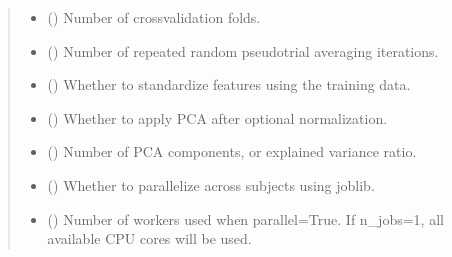 \documentclass[letterpaper,10pt,english]{sphinxhowto}
\begin{document}
\begin{fulllineitems}
\begin{quote}
\begin{description}
\begin{itemize}
\item {} 
\sphinxAtStartPar
{} (\sphinxstyleliteralemphasis{\sphinxupquote{, }}) \textendash{} Number of cross\sphinxhyphen{}validation folds.

\item {} 
\sphinxAtStartPar
{} (\sphinxstyleliteralemphasis{\sphinxupquote{, }}) \textendash{} Number of repeated random pseudo\sphinxhyphen{}trial averaging iterations.

\item {} 
\sphinxAtStartPar
{} (\sphinxstyleliteralemphasis{\sphinxupquote{, }}) \textendash{} Whether to standardize features using the training data.

\item {} 
\sphinxAtStartPar
{} (\sphinxstyleliteralemphasis{\sphinxupquote{, }}) \textendash{} Whether to apply PCA after optional normalization.

\item {} 
\sphinxAtStartPar
{} (\sphinxstyleliteralemphasis{\sphinxupquote{, }}) \textendash{} Number of PCA components, or explained variance ratio.

\item {} 
\sphinxAtStartPar
{} (\sphinxstyleliteralemphasis{\sphinxupquote{, }}) \textendash{} Whether to parallelize across subjects using joblib.

\item {} 
\sphinxAtStartPar
{} (\sphinxstyleliteralemphasis{\sphinxupquote{, }}) \textendash{} Number of workers used when parallel=True.
If n\_jobs=\sphinxhyphen{}1, all available CPU cores will be used.


\end{itemize}
\end{description}
\end{quote}
\end{fulllineitems}
\end{document}
